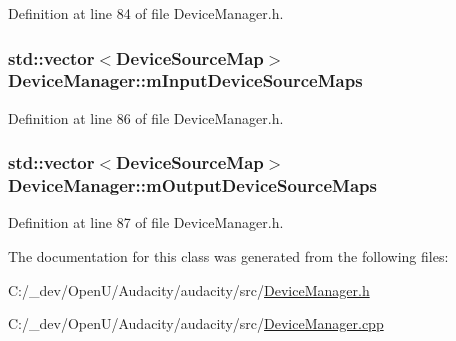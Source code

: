 Definition at line 84 of file Device\+Manager.\+h.

\subsubsection[{\texorpdfstring{m\+Input\+Device\+Source\+Maps}{mInputDeviceSourceMaps}}]{\setlength{\rightskip}{0pt plus 5cm}std\+::vector$<${\bf Device\+Source\+Map}$>$ Device\+Manager\+::m\+Input\+Device\+Source\+Maps\hspace{0.3cm}{\ttfamily [protected]}}\hypertarget{class_device_manager_ae410235c68d0b3c1c9d71e34000828b8}{}\label{class_device_manager_ae410235c68d0b3c1c9d71e34000828b8}


Definition at line 86 of file Device\+Manager.\+h.

\subsubsection[{\texorpdfstring{m\+Output\+Device\+Source\+Maps}{mOutputDeviceSourceMaps}}]{\setlength{\rightskip}{0pt plus 5cm}std\+::vector$<${\bf Device\+Source\+Map}$>$ Device\+Manager\+::m\+Output\+Device\+Source\+Maps\hspace{0.3cm}{\ttfamily [protected]}}\hypertarget{class_device_manager_ae03c7aa6d83e7b322b635bd238f63207}{}\label{class_device_manager_ae03c7aa6d83e7b322b635bd238f63207}


Definition at line 87 of file Device\+Manager.\+h.



The documentation for this class was generated from the following files\+:\begin{DoxyCompactItemize}
\item 
C\+:/\+\_\+dev/\+Open\+U/\+Audacity/audacity/src/\hyperlink{_device_manager_8h}{Device\+Manager.\+h}\item 
C\+:/\+\_\+dev/\+Open\+U/\+Audacity/audacity/src/\hyperlink{_device_manager_8cpp}{Device\+Manager.\+cpp}\end{DoxyCompactItemize}
